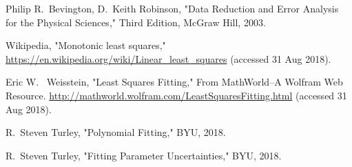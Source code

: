 \documentclass{scrartcl}
\begin{document}
\begin{thebibliography}{9}

Philip R.~Bevington, D.~Keith Robinson, 
"Data Reduction and Error Analysis for the Physical Sciences,"
Third Edition, McGraw Hill, 2003.

Wikipedia, "Monotonic least squares,"
\url{https://en.wikipedia.org/wiki/Linear_least_squares}
(accessed 31 Aug 2018).

Eric W.~ Weisstein, "Least Squares Fitting," From MathWorld--A Wolfram
Web Resource.
\url{http://mathworld.wolfram.com/LeastSquaresFitting.html}
(accessed 31 Aug 2018).

R.~Steven Turley, "Polynomial Fitting," BYU, 2018.

R.~Steven Turley, "Fitting Parameter Uncertainties," BYU, 2018.

\end{thebibliography}
\end{document}
